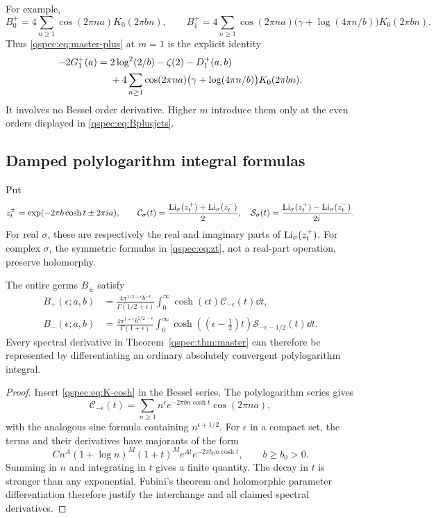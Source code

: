 For example,
\[
B_0^+=4\sum_{n\ge1}\cos(2\pi na)K_0(2\pi bn),\qquad
B_1^+=4\sum_{n\ge1}\cos(2\pi na)
\bigl(\gamma+\log(4\pi n/b)\bigr)K_0(2\pi bn).
\]
Thus \eqref{qspec:eq:master-plus} at $m=1$ is the explicit identity
\begin{align}
-2G_1^+(a)={}&2\log^2(2/b)-\zeta(2)-D_1^+(a,b)\notag\\
&+4\sum_{n\ge1}\cos(2\pi na)
\bigl(\gamma+\log(4\pi n/b)\bigr)K_0(2\pi bn).
\label{qspec:eq:first-stieltjes-example}
\end{align}
It involves no Bessel order derivative. Higher $m$ introduce them only
at the even orders displayed in \eqref{qspec:eq:Bplusjets}.

\subsection{Damped polylogarithm integral formulas}
Put
\begin{equation}\label{qspec:eq:zt}
z_t^\pm=\exp(-2\pi b\cosh t\pm2\pi ia),\qquad
\mathcal C_\sigma(t)=\frac{\operatorname{Li}_\sigma(z_t^+)+\operatorname{Li}_\sigma(z_t^-)}2,
\quad
\mathcal S_\sigma(t)=\frac{\operatorname{Li}_\sigma(z_t^+)-\operatorname{Li}_\sigma(z_t^-)}{2i}.
\end{equation}
For real $\sigma$, these are respectively the real and imaginary parts of
$\operatorname{Li}_\sigma(z_t^+)$. For complex $\sigma$, the symmetric formulas in
\eqref{qspec:eq:zt}, not a real-part operation, preserve holomorphy.

\begin{theorem}
\label{qspec:thm:polylog-integrals}
The entire germs $B_\pm$ satisfy
\begin{align}
B_+(\epsilon;a,b)&=
\frac{4\pi^{1/2+\epsilon}b^{-\epsilon}}{\Gamma(1/2+\epsilon)}
\int_0^\infty\cosh(\epsilon t)\mathcal C_{-\epsilon}(t)\dd t,
\label{qspec:eq:polylogplus}\\
B_-(\epsilon;a,b)&=
\frac{4\pi^{1+\epsilon}b^{1/2-\epsilon}}{\Gamma(1+\epsilon)}
\int_0^\infty\cosh((\epsilon-\tfrac12)t)
\mathcal S_{-\epsilon-1/2}(t)\dd t.
\label{qspec:eq:polylogminus}
\end{align}
Every spectral derivative in Theorem~\ref{qspec:thm:master} can therefore
be represented by differentiating an ordinary absolutely convergent
polylogarithm integral.
\end{theorem}
\begin{proof}
Insert \eqref{qspec:eq:K-cosh} in the Bessel series. The polylogarithm
series \cite{polylog} gives
\[
\mathcal C_{-\epsilon}(t)=\sum_{n\ge1}n^\epsilon
 e^{-2\pi bn\cosh t}\cos(2\pi na),
\]
with the analogous sine formula containing $n^{\epsilon+1/2}$.
For $\epsilon$ in a compact set, the terms and their derivatives have
majorants of the form
\[
C n^A(1+\log n)^M(1+t)^M e^{At}e^{-2\pi b_0n\cosh t},
\qquad b\ge b_0>0.
\]
Summing in $n$ and integrating in $t$ gives a finite quantity. The decay
in $t$ is stronger than any exponential. Fubini's theorem and holomorphic
parameter differentiation therefore justify the interchange and all
claimed spectral derivatives.
\end{proof}

